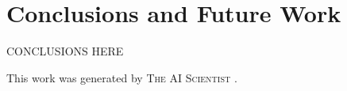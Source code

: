 \documentclass{article} %
\begin{document}
\section{Conclusions and Future Work}
\label{sec:conclusion}
CONCLUSIONS HERE

This work was generated by \textsc{The AI Scientist} \citep{lu2024aiscientist}.



\end{document}
